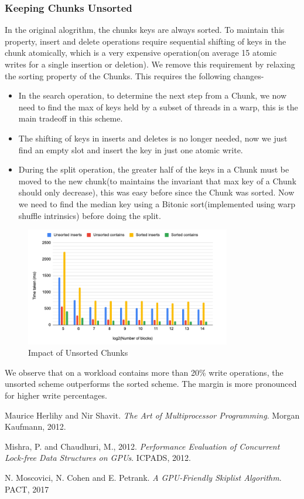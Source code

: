 \documentclass[12pt,a4paper]{article}
\begin{document}
\subsubsection{Keeping Chunks Unsorted}
In the original alogrithm, the chunks keys are always sorted. To maintain this property, insert and delete operations require sequential shifting of keys in the chunk atomically, which is a very expensive operation(on average 15 atomic writes for a single insertion or deletion). We remove this requirement by relaxing the sorting property of the Chunks. This requires the following changes-

\begin{itemize}
    \item In the search operation, to determine the next step from a Chunk, we now need to find the max of keys held by a subset of threads in a warp, this is the main tradeoff in this scheme.
    \item The shifting of keys in inserts and deletes is no longer needed, now we just find an empty slot and insert the key in just one atomic write.
    \item During the split operation, the greater half of the keys in a Chunk must be moved to the new chunk(to maintains the invariant that max key of a Chunk should only decrease), this was easy before since the Chunk was sorted. Now we need to find the median key using a Bitonic sort(implemented using warp shuffle intrinsics) before doing the split.
\end{itemize}


\begin{figure}[H]
    \centering
    \includegraphics[width=0.8\textwidth]{9.png}
    \caption{Impact of Unsorted Chunks}
\end{figure}

We observe that on a workload contains more than 20\% write operations, the unsorted scheme outperforms the sorted scheme. The margin is more pronounced for higher write percentages.



\begin{thebibliography}{9}
Maurice Herlihy and Nir Shavit. 
\textit{The Art of Multiprocessor Programming}. 
Morgan Kaufmann, 2012.

Mishra, P. and Chaudhuri, M., 2012.
\textit{Performance Evaluation of Concurrent Lock-free Data Structures on GPUs}. 
ICPADS, 2012.

N. Moscovici, N. Cohen and E. Petrank.
\textit{A GPU-Friendly Skiplist Algorithm}. 
PACT, 2017

\end{thebibliography}
\end{document}
